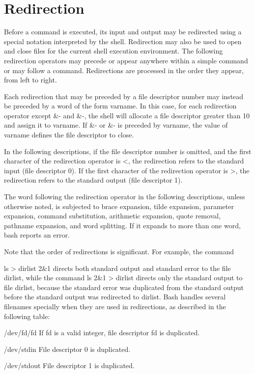 \section{Redirection}\label{sec:redirection}
Before a command is executed, its input and output may be redirected using a special notation interpreted by the shell. Redirection may also be used to open and close files for the current shell execution environment. The following redirection operators may precede or appear anywhere within a simple command or may follow a command. Redirections are processed in the order they appear, from left to right.

Each redirection that may be preceded by a file descriptor number may instead be preceded by a word of the form {varname}. In this case, for each redirection operator except \&- and \&-, the shell will allocate a file descriptor greater than 10 and assign it to varname. If \&- or \&- is preceded by {varname}, the value of varname defines the file descriptor to close.

In the following descriptions, if the file descriptor number is omitted, and the first character of the redirection operator is <, the redirection refers to the standard input (file descriptor 0). If the first character of the redirection operator is >, the redirection refers to the standard output (file descriptor 1).

The word following the redirection operator in the following descriptions, unless otherwise noted, is subjected to brace expansion, tilde expansion, parameter expansion, command substitution, arithmetic expansion, quote removal, pathname expansion, and word splitting. If it expands to more than one word, bash reports an error.

Note that the order of redirections is significant. For example, the command

ls > dirlist 2\&1
directs both standard output and standard error to the file dirlist, while the command
ls 2\&1 > dirlist
directs only the standard output to file dirlist, because the standard error was duplicated from the standard output before the standard output was redirected to dirlist.
Bash handles several filenames specially when they are used in redirections, as described in the following table:

/dev/fd/fd
If fd is a valid integer, file descriptor fd is duplicated.

/dev/stdin
File descriptor 0 is duplicated.

/dev/stdout
File descriptor 1 is duplicated.

